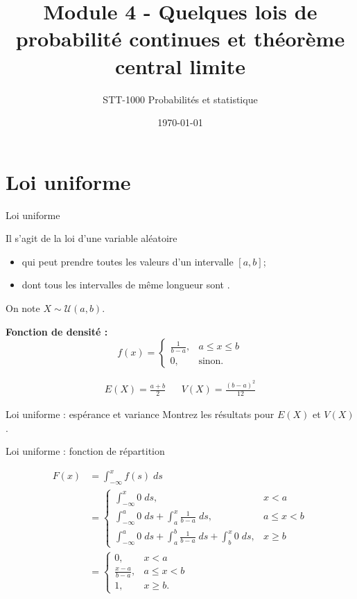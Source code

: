 \documentclass{BeamerTemplate}
\title{Module 4 - Quelques lois de probabilité continues et théorème central limite}
\subtitle{STT-1000 Probabilités et statistique}
\date{\today}
\begin{document}
\begin{frame}
\titlepage
\end{frame}

\section{Loi uniforme}

\begin{frame}[t]{Loi uniforme}

Il s'agit de la loi d'une variable aléatoire
\begin{itemize}
\item qui peut prendre toutes les valeurs d'un intervalle $[a,b]$;
\item dont tous les intervalles de même longueur sont .
\end{itemize}
On note $X\sim\mathcal{U}(a,b)$.

\vspace{0.1in}
\textbf{Fonction de densité :}
$$f(x)=\left\{\begin{array}{ll}
\displaystyle \frac{1}{b-a}, & a\leq x\leq b\\
0, & \text{sinon.}
\end{array}\right.$$

{\small
\begin{align*}
E(X)=\frac{a+b}{2} & & V(X) = \frac{(b-a)^2}{12}
\end{align*}
}

\end{frame}


\begin{frame}[t]{Loi uniforme : espérance et variance}
Montrez les résultats pour $E(X)$ et $V(X)$.

\vspace{5cm}

\end{frame}


\begin{frame}[t]{Loi uniforme : fonction de répartition}

{\small
\begin{align*}
F(x)&=
\int_{-\infty}^xf(s)\;ds\\[10pt]
&= \left\{\begin{array}{ll}
\int_{-\infty}^x0\;ds, & x<a\\[6pt]
\int_{-\infty}^a 0\;ds+\int_a^x\frac{1}{b-a}\;ds, & a \le x<b\\[6pt]
\int_{-\infty}^a 0\;ds+\int_a^b\frac{1}{b-a}\;ds+\int_b^x0\;ds,
& x\ge b
\end{array}\right.\\[10pt]
&=\left\{\begin{array}{cl}
0, & x<a\\[6pt]
\frac{x-a}{b-a},  & a\le x<b\\[6pt]
1,& x\ge b.
\end{array}\right.
\end{align*}
}
\end{frame}
\end{document}
